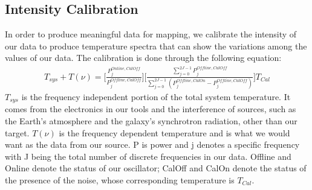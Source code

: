 \documentclass{article}
\begin{document}
\subsection{Intensity Calibration}
In order to produce meaningful data for mapping, we calibrate the
intensity of our data to produce temperature spectra that can show the
variations among the values of our data. The calibration is done through
the following equation:
\begin{align}T_{sys} + T(\nu) =
  \Big[\frac{P_j^{Online,CalOff}}{P_{j}^{Offline,CalOff}}\Big]
  \Big[\frac{\sum_{j=0}^{2J-1}P_{j}^{Offline,CalOff}}
  {\sum_{j=0}^{2J-1}(P_{j}^{Offline,CalOn} - P_{j}^{Offline,CalOff})}\Big]T_{Cal} 
\end{align}
$T_{sys}$ is the frequency independent portion of the total system
temperature. It comes from the electronics in our tools and the
interference of sources, such as the Earth's atmosphere and the galaxy's
synchrotron radiation, other than our target. $T(\nu)$ is the frequency
dependent temperature and is what we would want as the data from our
source. P is power and j denotes a specific frequency with J being the
total number of discrete frequencies in our data. Offline and Online
denote the status of our oscillator; CalOff and CalOn denote the status
of the presence of the noise, whose corresponding temperature is
$T_{Cal}$. 
\end{document}
